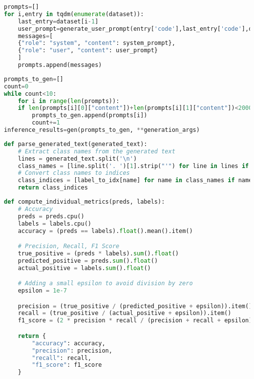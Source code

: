 \begin{latin}
	\begin{lstlisting}[language=Python, title=\rl{تولید پرامپت ها با استفاده از داده ها}]
prompts=[]
for i,entry in tqdm(enumerate(dataset)):
    last_entry=dataset[i-1]
    user_prompt=generate_user_prompt(entry['code'],last_entry['code'],dataset[i-1]["labels"])
    messages=[
    {"role": "system", "content": system_prompt},
    {"role": "user", "content": user_prompt}
    ]
    prompts.append(messages)
\end{lstlisting}
\end{latin}

\begin{latin}
	\begin{lstlisting}[language=Python, title=\rl{ورودی دادن پرامپت ها به پایپلاین تولید متن}]
prompts_to_gen=[]
count=0
while count<10:
    for i in range(len(prompts)):
    if len(prompts[i][0]["content"])+len(prompts[i][1]["content"])<2000:
        prompts_to_gen.append(prompts[i])
        count+=1
inference_results=gen(prompts_to_gen, **generation_args)
\end{lstlisting}
\end{latin}

\begin{latin}
	\begin{lstlisting}[language=Python, title=\rl{تابع تجزیه متن خروجی مدل بصورت آرایه برچسب ها}]
def parse_generated_text(generated_text):
    # Extract class names from the generated text
    lines = generated_text.split('\n')
    class_names = [line.split('. ')[1].strip("'") for line in lines if '. ' in line]
    # Convert class names to indices
    class_indices = [label_to_idx[name] for name in class_names if name in label_to_idx]
    return class_indices
\end{lstlisting}
\end{latin}

\begin{latin}
	\begin{lstlisting}[language=Python, title=\rl{تابع ارزیابی مدل}]
def compute_individual_metrics(preds, labels):
    # Accuracy
    preds = preds.cpu()
    labels = labels.cpu()
    accuracy = (preds == labels).float().mean().item()

    # Precision, Recall, F1 Score
    true_positive = (preds * labels).sum().float()
    predicted_positive = preds.sum().float()
    actual_positive = labels.sum().float()

    # Adding a small epsilon to avoid division by zero
    epsilon = 1e-7

    precision = (true_positive / (predicted_positive + epsilon)).item()
    recall = (true_positive / (actual_positive + epsilon)).item()
    f1_score = (2 * precision * recall / (precision + recall + epsilon))

    return {
        "accuracy": accuracy,
        "precision": precision,
        "recall": recall,
        "f1_score": f1_score
    } 
\end{lstlisting}
\end{latin}

